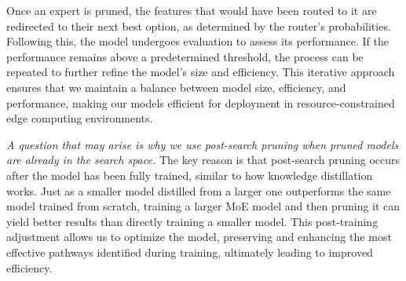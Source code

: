 Once an expert is pruned, the features that would have been routed to it are redirected to their next best option, as determined by the router's probabilities. Following this, the model undergoes evaluation to assess its performance. If the performance remains above a predetermined threshold, the process can be repeated to further refine the model's size and efficiency. This iterative approach ensures that we maintain a balance between model size, efficiency, and performance, making our models efficient for deployment in resource-constrained edge computing environments.

\textit{A question that may arise is why we use post-search pruning when pruned models are already in the search space.} The key reason is that post-search pruning occurs after the model has been fully trained, similar to how knowledge distillation works. Just as a smaller model distilled from a larger one outperforms the same model trained from scratch, training a larger MoE model and then pruning it can yield better results than directly training a smaller model. This post-training adjustment allows us to optimize the model, preserving and enhancing the most effective pathways identified during training, ultimately leading to improved efficiency.


\label{sec:metrics}
